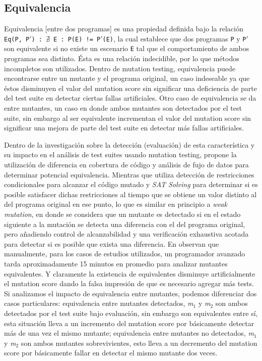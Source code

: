 \subsection{Equivalencia}

Equivalencia [entre dos programas] es una propiedad definida bajo la relaci\'on \texttt{Eq(P, P$\prime$) : $\nexists$ E : P(E) != P$\prime$(E)}, la cual establece que dos programas \texttt{P} y \texttt{P$\prime$} son equivalente si no existe un escenario \texttt{E} tal que el comportamiento de ambos programas sea distinto. \'Esta es una relaci\'on indecidible, por lo que m\'etodos incompletos son utilizados. Dentro de mutation testing, equivalencia puede encontrarse entre un mutante y el programa original, un caso indeseable ya que \'estos disminuyen el valor del mutation score sin significar una deficiencia de parte del test suite en detectar ciertas fallas artificiales. Otro caso de equivalencia se da entre mutantes, un caso en donde ambos mutantes son detectados por el test suite, sin embargo al ser equivalente incrementan el valor del mutation score sin significar una mejora de parte del test suite en detectar m\'as fallas artificiales.

Dentro de la investigaci\'on sobre la detecci\'on (evaluaci\'on) de esta caracter\'istica y su impacto en el an\'alisis de test suites usando mutation testing, \cite{biblography.mutation.evaluation.equivalent.Schuler+10} propone la utilizaci\'on de diferencia en cobertura de c\'odigo y an\'alisis de fujo de datos para determinar potencial equivalencia. Mientras que  \cite{biblography.mutation.evaluation.equivalent.Just+13} utiliza detecci\'on de restricciones condicionales para alcanzar el c\'odigo mutado y \emph{SAT Solving} para determinar si es posible satisfacer dichas restricciones al tiempo que se obtiene un valor distinto al del programa original en ese punto, lo que es similar en principio a \emph{weak mutation}, en donde se considera que un mutante es detectado si en el estado siguiente a la mutaci\'on se detecta una diferencia con el del programa original, pero a\~nadiendo control de alcanzabilidad y una verificaci\'on exhaustiva acotada para detectar si es posible que exista una diferencia.
En \cite{biblography.mutation.evaluation.equivalent.Grun+09} observan que manualmente, para los casos de estudios utilizados, un programador avanzado tarda aproximadamente 15 minutos en promedio para analizar mutantes equivalentes. Y claramente la existencia de equivalentes disminuye artificialmente el mutation score dando la falsa impresi\'on de que es necesario agregar m\'as tests. Si analizamos el impacto de equivalencia entre mutantes, podemos diferenciar dos casos particulares: equivalencia entre mutantes detectados, \emph{m$_1$} y \emph{m$_2$} son ambos detectados por el test suite bajo evaluaci\'on, sin embargo son equivalentes entre s\'i, esta situaci\'on lleva a un incremento del mutation score por b\'asicamente detectar m\'as de una vez el mismo mutante; equivalencia entre mutantes no detectados, \emph{m$_1$} y \emph{m$_2$} son ambos mutantes sobrevivientes, esto lleva a un decremento del mutation score por b\'asicamente fallar en detectar el mismo mutante dos veces.

